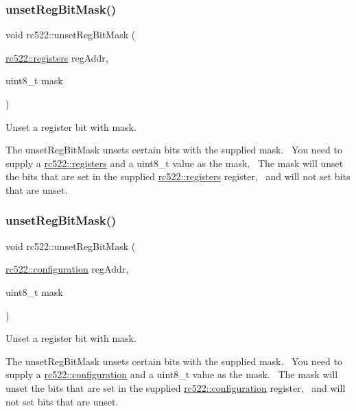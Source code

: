 \subsubsection{\texorpdfstring{unset\+Reg\+Bit\+Mask()}{unsetRegBitMask()}\hspace{0.1cm}{\footnotesize\ttfamily [2/4]}}
{\footnotesize\ttfamily void rc522\+::unset\+Reg\+Bit\+Mask (\begin{DoxyParamCaption}\item[{\hyperlink{classrc522_a83057db5f8fefa3dc9a6e8e5f0e191ee}{rc522\+::registers}}]{reg\+Addr,  }\item[{uint8\+\_\+t}]{mask }\end{DoxyParamCaption})}



Unset a register bit with mask. 

The unset\+Reg\+Bit\+Mask unsets certain bits with the supplied mask.~\newline
You need to supply a \hyperlink{classrc522_a83057db5f8fefa3dc9a6e8e5f0e191ee}{rc522\+::registers} and a uint8\+\_\+t value as the mask.~\newline
The mask will unset the bits that are set in the supplied \hyperlink{classrc522_a83057db5f8fefa3dc9a6e8e5f0e191ee}{rc522\+::registers} register,~\newline
and will not set bits that are unset. \mbox{\label{classrc522_a1ebf4ec7b5342e683310f526a1f10ede}} 
\subsubsection{\texorpdfstring{unset\+Reg\+Bit\+Mask()}{unsetRegBitMask()}\hspace{0.1cm}{\footnotesize\ttfamily [3/4]}}
{\footnotesize\ttfamily void rc522\+::unset\+Reg\+Bit\+Mask (\begin{DoxyParamCaption}\item[{\hyperlink{classrc522_afcf27c8198d017cd4e8173c7d7a6fded}{rc522\+::configuration}}]{reg\+Addr,  }\item[{uint8\+\_\+t}]{mask }\end{DoxyParamCaption})}



Unset a register bit with mask. 

The unset\+Reg\+Bit\+Mask unsets certain bits with the supplied mask.~\newline
You need to supply a \hyperlink{classrc522_afcf27c8198d017cd4e8173c7d7a6fded}{rc522\+::configuration} and a uint8\+\_\+t value as the mask.~\newline
The mask will unset the bits that are set in the supplied \hyperlink{classrc522_afcf27c8198d017cd4e8173c7d7a6fded}{rc522\+::configuration} register,~\newline
and will not set bits that are unset. \mbox{\label{classrc522_a52f345b15adb65750491a0bc4ccc7513}} 
